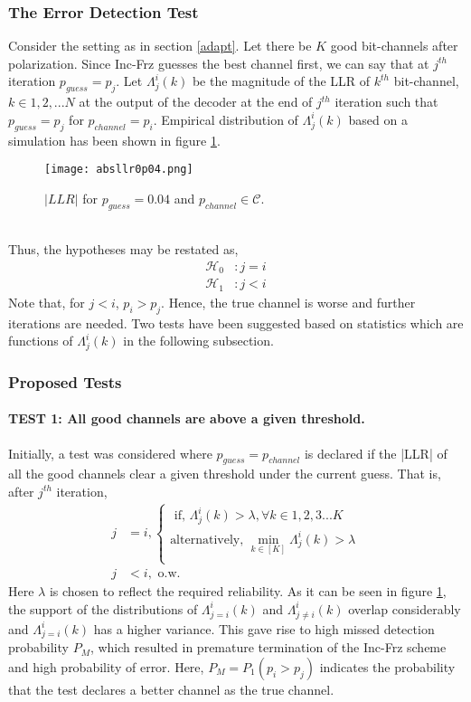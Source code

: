 \documentclass[
11pt, %
a4paper, %
oneside, %
headinclude,footinclude, %
BCOR5mm, %
]{scrartcl}
\begin{document}
\subsubsection{The Error Detection Test }
Consider the setting as in section \ref{adapt}. Let there be $K$ good bit-channels after polarization.  
Since Inc-Frz guesses the best channel first, we can say that at $j^{th}$ iteration $p_{guess}=p_j$. 
Let $\Lambda_j^i(k)$ be the magnitude of the LLR of $k^{th}$ bit-channel, $k\in{1,2,...N}$ at the output of the decoder at the end of $j^{th}$ iteration such that $p_{guess}=p_j$ for $p_{channel}=p_i$. Empirical distribution of $\Lambda_j^i(k)$ based on a simulation has been shown in figure \ref{fig:absllr}.
\begin{figure}[h]
 \begin{center}
    \texttt{[image: absllr0p04.png]}
  \end{center}
  \caption{$|LLR|$ for $p_{guess}=0.04$ and $p_{channel} \in \mathcal{C}$.}
  \label{fig:absllr}
\end{figure}\\
Thus, the hypotheses may be restated as,
\begin{align*}
\mathcal{H}_0 & :j=i\\
\mathcal{H}_1 & :j<i
\end{align*}
Note that, for $j < i$, $p_i > p_j$. Hence, the true channel is worse and further iterations are needed. Two tests have been suggested based on statistics which are functions of  $\Lambda_j^i(k)$ in the following subsection.

\subsubsection{Proposed Tests}
\paragraph{TEST 1: All good channels are above a given threshold.} Initially, a test was considered where $p_{guess}=p_{channel}$ is declared if the |LLR| of all the good channels clear a given threshold under the current guess. That is, after $j^{th}$ iteration,
\begin{align*}  
j & =i, 
\begin{cases}
\text{   if, }  \Lambda_{j}^i(k) > \lambda, \forall k \in {1,2,3...K}\\
\text{alternatively, } \displaystyle\min_{k \in [K]}\Lambda_{j}^i(k) > \lambda  \\
\end{cases}\\
 j & < i,  \text{ o.w.}
\end{align*} 
Here $\lambda$ is chosen to reflect the required reliability. As it can be seen in figure \ref{fig:absllr}, the support of the distributions of $\Lambda_{j=i}^i(k)$ and $\Lambda_{j \neq i}^i(k)$ overlap considerably and $\Lambda_{j=i}^i(k)$ has a higher variance. This gave rise to high missed detection probability $P_M$, which resulted in premature termination of the Inc-Frz scheme and high probability of error. Here, $P_M=P_1(p_i>p_j)$ indicates the probability that the test declares a better channel as the true channel.
\newpage
\end{document}
